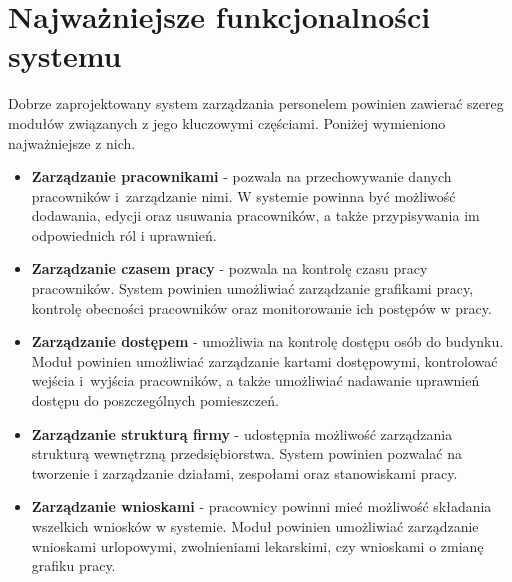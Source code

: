 
\section{Najważniejsze funkcjonalności systemu}


Dobrze zaprojektowany system zarządzania personelem powinien zawierać szereg modułów związanych z jego kluczowymi częściami. Poniżej wymieniono najważniejsze z nich.

\begin{itemize}
    \item \textbf{Zarządzanie pracownikami} - pozwala na przechowywanie danych pracowników i~zarządzanie nimi. W systemie powinna być możliwość dodawania, edycji oraz usuwania pracowników, a także przypisywania im odpowiednich ról i uprawnień.
    \item \textbf{Zarządzanie czasem pracy} - pozwala na kontrolę czasu pracy pracowników. System powinien umożliwiać zarządzanie grafikami pracy, kontrolę obecności pracowników oraz monitorowanie ich postępów w pracy.
    \item \textbf{Zarządzanie dostępem} - umożliwia na kontrolę dostępu osób do budynku. Moduł powinien umożliwiać zarządzanie kartami dostępowymi, kontrolować wejścia i~wyjścia pracowników, a także umożliwiać nadawanie uprawnień dostępu do poszczególnych pomieszczeń.
    \item \textbf{Zarządzanie strukturą firmy} - udostępnia możliwość zarządzania strukturą wewnętrzną przedsiębiorstwa. System powinien pozwalać na tworzenie i zarządzanie działami, zespołami oraz stanowiskami pracy.
    \item \textbf{Zarządzanie wnioskami} - pracownicy powinni mieć możliwość składania wszelkich wniosków w systemie. Moduł powinien umożliwiać zarządzanie wnioskami urlopowymi, zwolnieniami lekarskimi, czy wnioskami o zmianę grafiku pracy.
\end{itemize}

